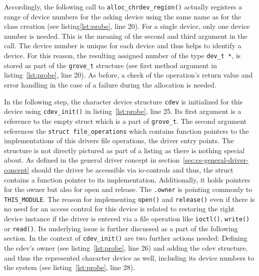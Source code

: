 Accordingly, the following call to \texttt{alloc_chrdev_region()} actually registers a range of device numbers for the asking device using the same name as for the class creation (see listing\ref{lst:probe}, line 20).
For a single device, only one device number is needed.
This is the meaning of the second and third argument in the call.
The device number is unique for each device and thus helps to identify a device.
For this reason, the resulting assigned number of the type \texttt{dev_t *}, is stored as part of the \texttt{grove_t} structure (see first method argument in listing~\ref{lst:probe}, line 20).
As before, a check of the operation's return value and error handling in the case of a failure during the allocation is needed.

In the following step, the character device structure \texttt{cdev} is initialized for this device using \texttt{cdev_init()} in listing~\ref{lst:probe}, line 25. 
Its first argument is a reference to the empty struct which is a part of \texttt{grove_t}.
The second argument references the \texttt{struct file_operations} which contains function pointers to the implementations of this drivers file operations, the driver entry points.
The structure is not directly pictured as part of a listing as there is nothing special about.
As defined in the general driver concept in section~\ref{sec:cs-general-driver-concept} should the driver be accessible via \ac{io}-controls and thus, the struct contains a function pointer to its implementation.
Additionally, it holds pointers for the owner but also for open and release.
The \texttt{.owner} is pointing commonly to \texttt{THIS_MODULE}.
The reason for implementing \texttt{open()} and \texttt{release()} even if there is no need for an access control for this device is related to restoring the right device instance if the driver is entered via a file operation like \texttt{ioctl()}, \texttt{write()} or \texttt{read()}.
Its underlying issue is further discussed as a part of the following section.
In the context of \texttt{cdev_init()} are two further actions needed: Defining the cdev's owner (see listing~\ref{lst:probe}, line 26) and adding the cdev structure, and thus the represented character device as well, including its device numbers to the system (see listing~\ref{lst:probe}, line 28).

